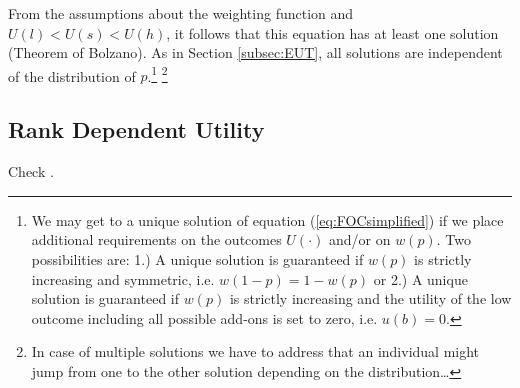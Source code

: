 From the assumptions about the weighting function and $U(l)<U(s)<U(h)$, it follows that this equation has at least one solution (Theorem of Bolzano).
As in Section \ref{subsec:EUT}, all solutions are independent of the distribution of $p$.\footnote{
We may get to a unique solution of equation (\ref{eq:FOCsimplified}) if we place additional requirements on the outcomes $U(\cdot)$ and/or on $w(p)$.
Two possibilities are:
1.) A unique solution is guaranteed if $w(p)$ is strictly increasing and symmetric, i.e. $w(1-p) = 1-w(p)$ or
2.) A unique solution is guaranteed if $w(p)$ is strictly increasing and the utility of the low outcome including all possible add-ons is set to zero, i.e. $u(b) = 0$.
}  
\footnote{
In case of multiple solutions we have to address that an individual might jump from one to the other solution depending on the distribution\dots
}
	


\subsection{Rank Dependent Utility}

Check \cite{Li2020a}.



